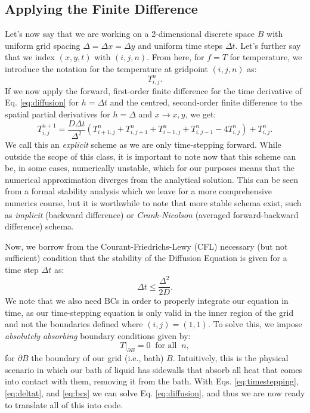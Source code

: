 \documentclass[11pt]{article}
\begin{document}
\subsection*{Applying the Finite Difference}

Let's now say that we are working on a 2-dimensional discrete space $B$ with uniform grid spacing $\Delta = \Delta x = \Delta y$ and uniform time steps $\Delta t$.
Let's further say that we index $\left(x,y,t\right)$ with $\left(i,j, n\right)$.
From here, for $f = T$ for temperature, we introduce the notation for the temperature at gridpoint $\left(i,j,n\right)$ as:
 \begin{equation}
	T_{i,j}^n.
\end{equation}
If we now apply the forward, first-order finite difference for the time derivative of Eq. \eqref{eq:diffusion} for $h = \Delta t$ and the centred, second-order finite difference to the spatial partial derivatives for $h = \Delta$ and $x \to  x, y$, we get:
\begin{equation}
	T_{i,j}^{n+1} = \frac{D \Delta t}{\Delta^2} \left(T_{i+1,j}^n + T_{i,j+1}^n + T_{i-1,j}^n + T_{i,j-1}^n - 4T_{i,j}^n\right) + T_{i,j}^n.
	\label{eq:timestepping}
\end{equation}
We call this an \emph{explicit} scheme as we are only time-stepping forward. 
While outside the scope of this class, it is important to note now that this scheme can be, in some cases, numerically unstable, which for our purposes means that the numerical approximation diverges from the analytical solution. 
This can be seen from a formal stability analysis which we leave for a more comprehensive numerics course, but it is worthwhile to note that more stable schema exist, such as \emph{implicit} (backward difference) or \emph{Crank-Nicolson} (averaged forward-backward difference) schema. \par
Now, we borrow from the Courant-Friedrichs-Lewy (CFL) necessary (but not sufficient) condition that the stability of the Diffusion Equation is given for a time step $\Delta t$ as:
\begin{equation}
	\Delta t \le \frac{\Delta ^2}{2D}.
	\label{eq:deltat}
\end{equation}
We note that we also need BCs in order to properly integrate our equation in time, as our time-stepping equation is only valid in the inner region of the grid and not the boundaries defined where $\left(i,j\right)=\left(1,1\right)$.
To solve this, we impose \emph{absolutely absorbing} boundary conditions given by:
\begin{equation}
	T\big\lvert_{\partial B} = 0 \: \text{ for all } \: n,
	\label{eq:bcs}
\end{equation}
for $\partial B$ the boundary of our grid  (i.e., bath) $B$.
Intuitively, this is the physical scenario in which our bath of liquid has sidewalls that absorb all heat that comes into contact with them, removing it from the bath.
With Eqs. \eqref{eq:timestepping}, \eqref{eq:deltat}, and \eqref{eq:bcs} we can solve Eq. \eqref{eq:diffusion}, and thus we are now ready to translate all of this into code.

\end{document}
